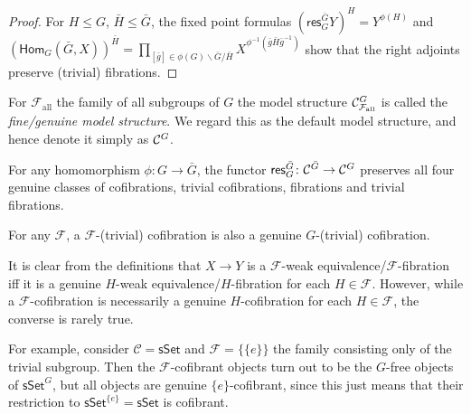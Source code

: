 \documentclass[a4paper,10pt
 ,draft
]{article}%
\begin{document}
\begin{proof}
For $H \leq G$, $\bar{H} \leq \bar{G}$, the fixed point formulas
$\left(\mathsf{res}^{\bar{G}}_G Y \right)^H = Y^{\phi(H)}$
and
$\left(\mathsf{Hom}_{G}(\bar{G},X)\right)^{\bar{H}}=
\prod_{[\bar{g}] \in \phi(G) \backslash \bar{G}/\bar{H}}
X^{\phi^{-1}(\bar{g}\bar{H}\bar{g}^{-1})}$
show that the right adjoints preserve (trivial) fibrations.
\end{proof}



For $\mathcal{F}_{\text{all}}$
the family of all subgroups of $G$
the model structure
$\mathcal{C}^G_{\mathcal{F}_{\text{all}}}$ is called the 
\textit{fine/genuine model structure}.
We regard this as the default model structure, 
and hence denote it simply as $\mathcal{C}^G$.

\begin{corollary}\label{RESGEN COR}
For any homomorphism $\phi \colon G \to \bar{G}$, the functor
$\mathsf{res}^{\bar{G}}_G \colon 
\mathcal{C}^{\bar{G}} \to \mathcal{C}^G$
preserves all four genuine classes of 
cofibrations, trivial cofibrations, fibrations and trivial fibrations.
\end{corollary}

\begin{corollary}\label{FTRIVALL COR}
For any $\mathcal{F}$, a $\mathcal{F}$-(trivial) cofibration is also a genuine
$G$-(trivial) cofibration.	
\end{corollary}


\begin{remark}\label{COFNOTRES REM}
	It is clear
	from the definitions
	that 
	$X \to Y$ is a $\mathcal{F}$-weak equivalence/$\mathcal{F}$-fibration iff it is a genuine
	$H$-weak equivalence/$H$-fibration
	for each $H \in \mathcal{F}$.
	However, while a $\mathcal{F}$-cofibration is necessarily a genuine $H$-cofibration for each $H \in \mathcal{F}$, the converse is rarely true.
	
For example, consider $\mathcal{C} = \mathsf{sSet}$ and
	$\mathcal{F}=\{\{e\}\}$ the family consisting only of the trivial subgroup. Then the $\mathcal{F}$-cofibrant objects
	turn out to be the $G$-free objects of $\mathsf{sSet}^G$, but all objects are
	genuine $\{e\}$-cofibrant, since this just means that their restriction to
	$\mathsf{sSet}^{\{e\}}=\mathsf{sSet}$ is cofibrant.
%	
\end{remark}
\end{document}
